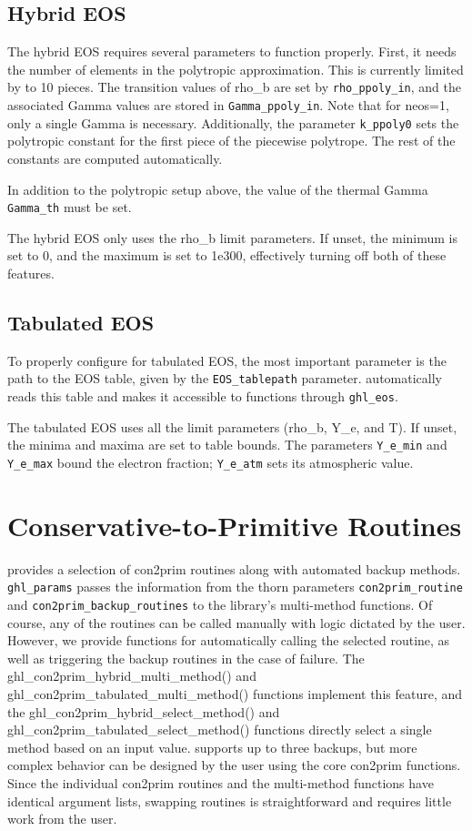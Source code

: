 \documentclass{article}
\begin{document}
\subsection{Hybrid EOS}

The hybrid EOS requires several parameters to function properly.
First, it needs the number of elements in the polytropic approximation.
This is currently limited by \grhayl{} to 10 pieces. The transition values
of rho\_b are set by \texttt{rho\_ppoly\_in}, and the associated Gamma
values are stored in \texttt{Gamma\_ppoly\_in}. Note that for neos=1,
only a single Gamma is necessary. Additionally, the parameter \texttt{k\_ppoly0}
sets the polytropic constant for the first piece of the piecewise polytrope.
The rest of the constants are computed automatically.

In addition to the polytropic setup above, the value of the thermal Gamma
\texttt{Gamma\_th} must be set.

The hybrid EOS only uses the rho\_b limit parameters. If unset, the
minimum is set to 0, and the maximum is set to 1e300, effectively turning
off both of these features.

\subsection{Tabulated EOS}

To properly configure for tabulated EOS, the most important parameter is
the path to the EOS table, given by the \texttt{EOS\_tablepath} parameter.
\glib{} automatically reads this table and makes it accessible to \grhayl{}
functions through \texttt{ghl\_eos}.

The tabulated EOS uses all the limit parameters (rho\_b, Y\_e, and T).
If unset, the minima and maxima are set to table bounds.
The parameters \texttt{Y\_e\_min} and \texttt{Y\_e\_max} bound the electron
fraction; \texttt{Y\_e\_atm} sets its atmospheric value.

\section{Conservative-to-Primitive Routines}

\grhayl{} provides a selection of con2prim routines along with automated
backup methods. \texttt{ghl\_params} passes the information from the
thorn parameters \texttt{con2prim\_routine} and \texttt{con2prim\_backup\_routines}
to the library's multi-method functions. Of course, any of the routines
can be called manually with logic dictated by the user. However, we
provide functions for automatically calling the selected routine,
as well as triggering the backup routines in the case of failure.
The ghl\_con2prim\_hybrid\_multi\_method() and
ghl\_con2prim\_tabulated\_multi\_method() functions implement this
feature, and the ghl\_con2prim\_hybrid\_select\_method() and
ghl\_con2prim\_tabulated\_select\_method() functions directly select
a single method based on an input value. \grhayl{} supports up to three
backups, but more complex behavior can be designed by the user using
the core con2prim functions. Since the individual con2prim routines
and the multi-method functions have identical argument lists, swapping
routines is straightforward and requires little work from the user.
\end{document}
